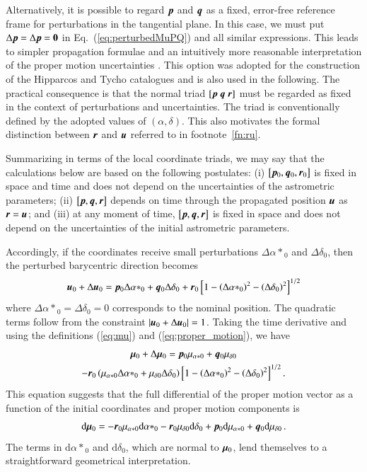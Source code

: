 \documentclass{aa}
\def\vec#1{\ensuremath{\mathchoice{\mbox{\boldmath$\displaystyle#1$}}
{\mbox{\boldmath$\textstyle#1$}}
{\mbox{\boldmath$\scriptstyle#1$}}
{\mbox{\boldmath$\scriptscriptstyle#1$}}}}
\begin{document}
Alternatively, it is possible to regard $\vec{p}$ and $\vec{q}$ as a fixed, error-free
reference frame for perturbations in the tangential plane. In this case, we must put
$\Delta\vec{p}=\Delta\vec{p}=\vec{0}$ in Eq.~(\ref{eq:perturbedMuPQ}) and all similar
expressions. This leads to simpler propagation formulae and an intuitively more reasonable
interpretation of the proper motion uncertainties \citep{lindegren1995b}. This option was
adopted for the construction of the Hipparcos and Tycho catalogues
\citep[cf.\ Sect.~1.5.5 in Vol.~1 of][]{esa1997} and is also used in the following.
The practical consequence is that the normal triad $[\vec{p}~\vec{q}~\vec{r}]$ must be
regarded as fixed in the context of perturbations and uncertainties. The triad is conventionally
defined by the adopted values of $(\alpha,\delta)$. This also motivates the formal distinction
between $\vec{r}$ and $\vec{u}$ referred to in footnote~\ref{fn:ru}.

Summarizing in terms of the local coordinate triads, we may say that the calculations below are based on the following postulates:
(i) $\left[\vec{p}_0, \vec{q}_0, \vec{r}_0\right]$ is fixed in space and time and does not depend on the uncertainties of the astrometric parameters;
(ii) $\left[\vec{p}, \vec{q}, \vec{r}\right]$ depends on time through the propagated position $\vec{u}$ as $\vec{r} = \vec{u}$; and
(iii) at any moment of time, $\left[\vec{p}, \vec{q}, \vec{r}\right]$ is fixed in space and does not depend on the uncertainties of the initial astrometric parameters.

Accordingly, if the coordinates receive small perturbations $\Delta{\alpha*}_0$ and $\Delta\delta_0$,
then the perturbed barycentric direction becomes
\begin{equation}
  \vec{u}_0 + \Delta\vec{u}_0=
  \vec{p}_0\Delta{\alpha*}_0+\vec{q}_0\Delta\delta_0
  +\vec{r}_0\left[1-\left(\Delta{\alpha*}_0\right)^2-\left(\Delta\delta_0\right)^2\right]^{1/2}
\end{equation}
where $\Delta{\alpha*}_0=\Delta\delta_0=0$ corresponds to the nominal position.
The quadratic terms follow from the constraint $|{\vec{u}_0}+\Delta\vec{u}_0|=1$.
Taking the time derivative and using the definitions (\ref{eq:mu}) and (\ref{eq:proper_motion}), we have
 \begin{multline}
  \vec{\mu}_0+\Delta\vec{\mu}_0=
  \vec{p}_0\mu_{\alpha*0}+\vec{q}_0\mu_{\delta0}\\
  -\vec{r}_0\left(\mu_{\alpha*0}\Delta{\alpha*}_0+\mu_{\delta0}\Delta\delta_0\right)
  \left[1-\left(\Delta{\alpha*}_0\right)^2-\left(\Delta\delta_0\right)^2\right]^{1/2}.
 \end{multline}
This equation suggests that the full differential of the proper motion vector as a function of the initial coordinates and proper motion components is
\begin{equation}\label{eq:dmu0}
  \mathrm{d}\vec{\mu}_0=-\vec{r}_0\mu_{\alpha*0}\mathrm{d}{\alpha*}_0
  -\vec{r}_0\mu_{\delta0}\mathrm{d}\delta_0
  +\vec{p}_0\mathrm{d}\mu_{\alpha*0}+\vec{q}_0\mathrm{d}\mu_{\delta0}\,.
\end{equation}
The terms in $\mathrm{d}{\alpha*}_0$ and $\mathrm{d}\delta_0$, which are normal to
$\vec{\mu}_0$, lend themselves to a straightforward geometrical interpretation.
\end{document}
